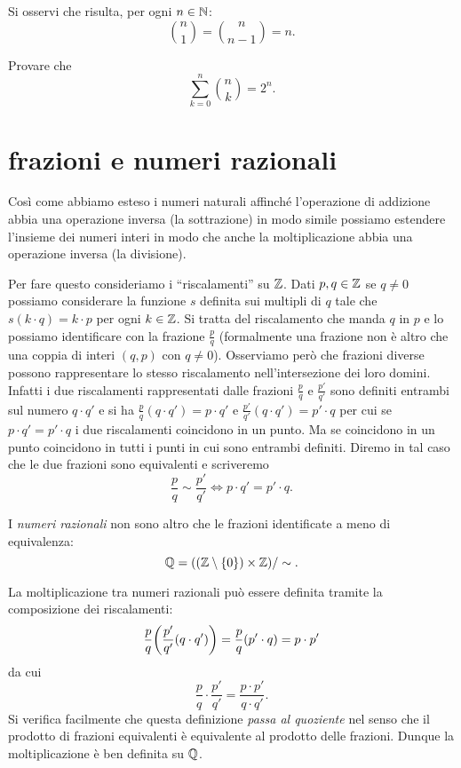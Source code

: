 Si osservi che risulta, per ogni $n\in {\mathbb N}$:
\[
  {n \choose 1} = {n \choose n-1} = n.
\]
  
\begin{exercise}
  Provare che
  \[
   \sum_{k=0}^n {n \choose k} = 2^n.
  \]
\end{exercise}  
  
\section{frazioni e numeri razionali}

Così come abbiamo esteso i numeri naturali affinché l'operazione di addizione abbia 
una operazione inversa (la sottrazione) in modo simile possiamo estendere l'insieme 
dei numeri interi in modo che anche la moltiplicazione abbia una operazione inversa 
(la divisione).

Per fare questo consideriamo i ``riscalamenti'' su ${\mathbb Z}$. Dati $p,q\in {\mathbb Z}$ se 
$q\neq 0$ possiamo considerare la funzione $s$ definita sui multipli di $q$ 
tale che $s(k\cdot q) = k\cdot p$ per ogni $k\in {\mathbb Z}$.
Si tratta del riscalamento che manda $q$ in $p$ e lo possiamo identificare 
con la frazione $\frac{p}{q}$ (formalmente una frazione non è altro che una 
coppia di interi $(q,p)$ con $q\neq 0$).
Osserviamo però che frazioni diverse possono rappresentare lo stesso riscalamento 
nell'intersezione dei loro domini. 
Infatti i due riscalamenti rappresentati dalle frazioni $\frac{p}{q}$ e $\frac{p'}{q'}$
sono definiti entrambi sul numero $q\cdot q'$ e si ha
$\frac{p}{q}(q\cdot q') = p\cdot q'$ e  $\frac{p'}{q'}(q\cdot q')=p'\cdot q$ per cui se $p\cdot q'=p'\cdot q$
i due riscalamenti coincidono in un punto. Ma se coincidono in un punto coincidono 
in tutti i punti in cui sono entrambi definiti. 
Diremo in tal caso che le due frazioni sono equivalenti e scriveremo 
\[
  \frac{p}{q} \sim \frac{p'}{q'} \iff p\cdot q'=p'\cdot q.  
\]

I \emph{numeri razionali} non sono altro che le frazioni identificate 
a meno di equivalenza:
\[
  {\mathbb Q} = (({\mathbb Z}\setminus{\left\{ 0 \right\}})\times {\mathbb Z})/\sim.
\]

La moltiplicazione tra numeri razionali può essere definita tramite la composizione 
dei riscalamenti:
\[
  \frac{p}{q}{\left( \frac{p'}{q'} (q\cdot q') \right)} = \frac{p}{q}(p'\cdot q) = p\cdot p'
\]
da cui 
\[
 \frac{p}{q} \cdot \frac{p'}{q'} = \frac{p\cdot p'}{q\cdot q'}.  
\]
Si verifica facilmente che questa definizione \emph{passa al quoziente} 
nel senso che il prodotto di frazioni equivalenti è equivalente al prodotto 
delle frazioni. 
Dunque la moltiplicazione è ben definita su ${\mathbb Q}$.


